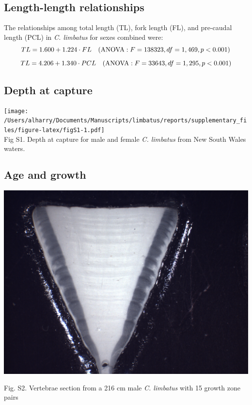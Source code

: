 \documentclass[]{article}
\title{}
\author{}
\date{}
\begin{document}
\subsection{Length-length
relationships}\label{length-length-relationships}

The relationships among total length (TL), fork length (FL), and
pre-caudal length (PCL) in \emph{C. limbatus} for sexes combined were:
\[TL = 1.600 + 1.224 \cdot FL \quad (\textup{ANOVA}: F = 138323, df = 1, 469, p < 0.001) \]
\[TL = 4.206 + 1.340 \cdot PCL \quad (\textup{ANOVA}: F = 33643, df = 1, 295, p < 0.001)\]

\subsection{Depth at capture}\label{depth-at-capture}

\texttt{[image: /Users/alharry/Documents/Manuscripts/limbatus/reports/supplementary\_files/figure-latex/figS1-1.pdf]}\\
Fig S1. Depth at capture for male and female \emph{C. limbatus} from New
South Wales waters.

\newpage

\subsection{Age and growth}\label{age-and-growth}

\includegraphics{../data/KH021208-8.png}

Fig. S2. Vertebrae section from a 216 cm male \emph{C. limbatus} with 15
growth zone pairs
\end{document}

